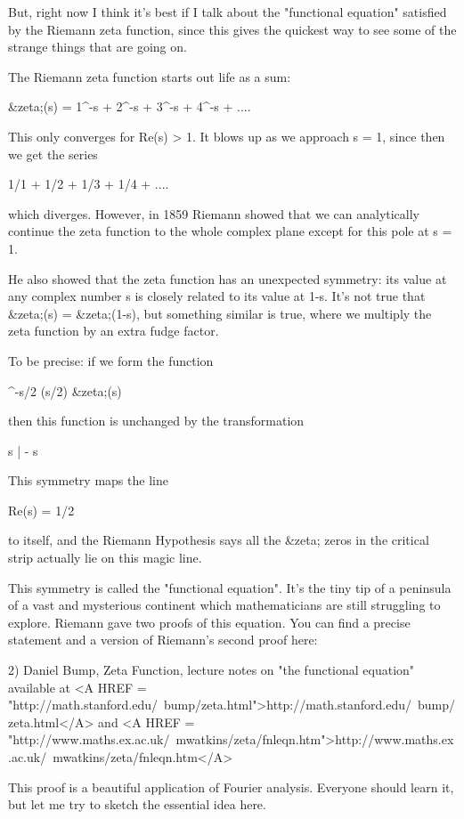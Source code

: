 But, right now I think it's best if I talk about the "functional equation" 
satisfied by the Riemann zeta function, since this gives the quickest way 
to see some of the strange things that are going on.

The Riemann zeta function starts out life as a sum:

&zeta;(s) = 1^{-s} + 2^{-s} + 3^{-s} + 4^{-s} + ....

This only converges for Re(s) > 1.  It blows up as we approach s = 1, 
since then we get the series

1/1 + 1/2 + 1/3 + 1/4 + ....

which diverges.  However, in 1859 Riemann showed that we can analytically 
continue the zeta function to the whole complex plane except for this pole 
at s = 1.  

He also showed that the zeta function has an unexpected symmetry: 
its value at any complex number s is closely related to its value at 1-s.  
It's not true that &zeta;(s) = &zeta;(1-s), but something similar is true, 
where we multiply the zeta function by an extra fudge factor.  

To be precise: if we form the function

\pi ^{-s/2} \Gamma (s/2) &zeta;(s)

then this function is unchanged by the transformation

s | - s

This symmetry maps the line 

Re(s) = 1/2

to itself, and the Riemann Hypothesis says all the &zeta; zeros in 
the critical strip actually lie on this magic line.  

This symmetry is called the "functional equation".  It's the tiny tip of a 
peninsula of a vast and mysterious continent which mathematicians are still 
struggling to explore.  Riemann gave two proofs of this equation.  You can 
find a precise statement and a version of Riemann's second proof here:

2) Daniel Bump, Zeta Function, lecture notes on "the functional
equation" available at <A HREF = "http://math.stanford.edu/~bump/zeta.html">http://math.stanford.edu/~bump/zeta.html</A>
and <A HREF = "http://www.maths.ex.ac.uk/~mwatkins/zeta/fnleqn.htm">http://www.maths.ex.ac.uk/~mwatkins/zeta/fnleqn.htm</A>

This proof is a beautiful application of Fourier analysis.  Everyone
should learn it, but let me try to sketch the essential idea here.

